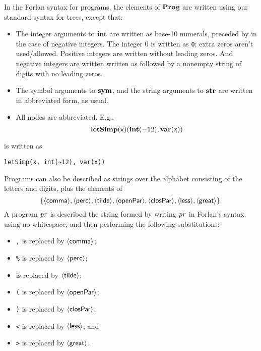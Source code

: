 In the Forlan syntax for programs, the elements of $\mathbf{Prog}$ are
written using our standard syntax for trees, except that:
\begin{itemize}
\item The integer arguments to $\mathbf{int}$ are written as base-10 numerals,
  preceded by \texttt{\tildesym} in the case of negative integers.  The
  integer $0$ is written as \texttt{0}; extra zeros aren't used/allowed.
  Positive integers are written without leading zeros. And negative
  integers are written written as \texttt{\tildesym} followed by a nonempty
  string of digits with no leading zeros.

\item The symbol arguments to $\mathbf{sym}$, and the string arguments to
  $\mathbf{str}$ are written in abbreviated form, as usual.

\item All nodes are abbreviated.  E.g.,
  \begin{displaymath}
    \mathbf{letSimp}(\mathsf{x})(\mathbf{int}(-12),\mathbf{var}(\mathsf{x}))
  \end{displaymath}
\end{itemize}
is written as
\begin{verbatim}
letSimp(x, int(~12), var(x))
\end{verbatim}

Programs can also be described as strings over the
alphabet consisting of the letters and digits, plus the elements of
\begin{displaymath}
\{{\langle\mathsf{comma}\rangle}, {\langle\mathsf{perc}\rangle}, {\langle\mathsf{tilde}\rangle}, {\langle\mathsf{openPar}\rangle},
{\langle\mathsf{closPar}\rangle}, {\langle\mathsf{less}\rangle}, {\langle\mathsf{great}\rangle}\} .
\end{displaymath}
A program $\mathit{pr}$ is described the string formed by writing $\mathit{pr}$
in Forlan's syntax, using no whitespace, and then performing
the following substitutions:
\begin{itemize}
\item \texttt{,} is replaced by ${\langle\mathsf{comma}\rangle}$;

\item \texttt{\%} is replaced by ${\langle\mathsf{perc}\rangle}$;

\item \texttt{\tildesym} is replaced by ${\langle\mathsf{tilde}\rangle}$;

\item \texttt{(} is replaced by ${\langle\mathsf{openPar}\rangle}$;

\item \texttt{)} is replaced by ${\langle\mathsf{closPar}\rangle}$;

\item \texttt{<} is replaced by ${\langle\mathsf{less}\rangle}$; and

\item \texttt{>} is replaced by ${\langle\mathsf{great}\rangle}$.
\end{itemize}

